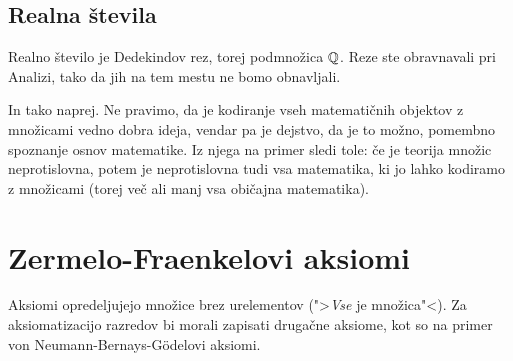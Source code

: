 \subsection{Realna števila}

Realno število je Dedekindov rez, torej podmnožica $\mathbb{Q}$. Reze ste obravnavali pri Analizi, tako da jih na tem mestu ne
bomo obnavljali.

In tako naprej. Ne pravimo, da je kodiranje vseh matematičnih objektov z množicami vedno
dobra ideja, vendar pa je dejstvo, da je to možno, pomembno spoznanje osnov matematike. Iz
njega na primer sledi tole: če je teorija množic neprotislovna, potem je neprotislovna
tudi vsa matematika, ki jo lahko kodiramo z množicami (torej več ali manj vsa običajna
matematika).



\section{Zermelo-Fraenkelovi aksiomi}

Aksiomi opredeljujejo množice brez urelementov (">\emph{Vse} je množica"<). Za aksiomatizacijo razredov bi morali zapisati drugačne aksiome, kot so na primer von Neumann-Bernays-Gödelovi aksiomi.

